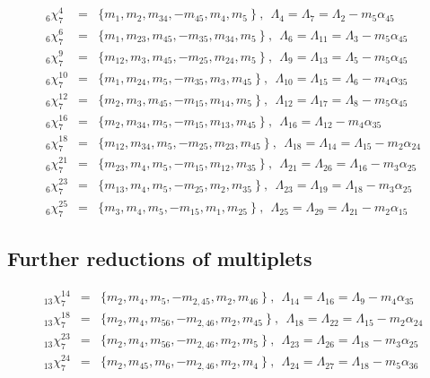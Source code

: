 \documentclass[a4paper]{jpconf}
\def\np{\newpage}
\def\bb {\begin {eqnarray}}
\def\eqnn#1{\bb\label{#1}}
\def\eea {\end {eqnarray}}
\def\nn{\nonumber}
\def\np{\vfill\eject}
\def\a{\alpha}
\def\L{\Lambda}
\begin{document}
   \eqnn{slt76}
  _6\chi^4_7 &=& \{ m_1, m_2, m_{34}, -m_{45}, m_{4}, m_{5} \   \} \ ,~~\L_4 = \L_7 = \L_2 - m_5 \a_{45}  \\
 _6\chi^6_7 &=& \{ m_1, m_{23}, m_{45}, -m_{35}, m_{34}, m_{5} \   \} \ ,~~\L_6 = \L_{11} = \L_3 - m_5 \a_{45} \nn\\ %
 _6\chi^9_7 &=& \{ m_{12}, m_{3}, m_{45}, -m_{25}, m_{24}, m_{5} \   \} \ ,~~\L_9 = \L_{13} = \L_5 - m_5 \a_{45} \nn\\ %
_6\chi^{10}_7 &=& \{ m_1, m_{24}, m_{5}, -m_{35}, m_{3}, m_{45} \   \} \ ,~~\L_{10} = \L_{15} = \L_6 - m_4 \a_{35}  \nn\\ %
 _6\chi^{12}_7 &=& \{ m_2, m_{3}, m_{45}, -m_{15}, m_{14}, m_{5} \   \} \ ,~~\L_{12} = \L_{17} = \L_8 - m_5 \a_{45} \nn\\ %
   _6\chi^{16}_7 &=& \{ m_2, m_{34}, m_{5}, -m_{15}, m_{13}, m_{45} \   \} \ ,~~\L_{16} = \L_{12} - m_4 \a_{35} \nn\\ %
 _6\chi^{18}_7 &=& \{ m_{12}, m_{34}, m_{5}, -m_{25}, m_{23}, m_{45} \   \} \ ,~~\L_{18} = \L_{14} =\L_{15} - m_2 \a_{24}  \nn\\ %
  _6\chi^{21}_7 &=& \{ m_{23}, m_{4}, m_{5}, -m_{15}, m_{12}, m_{35} \   \} \ ,~~\L_{21} = \L_{26} =\L_{16} - m_3 \a_{25} \nn\\ %
 _6\chi^{23}_7 &=& \{ m_{13}, m_{4}, m_{5}, -m_{25}, m_{2}, m_{35} \   \} \ ,~~\L_{23} =\L_{19} =  \L_{18} - m_3 \a_{25}  \nn\\ %
 _6\chi^{25}_7 &=& \{ m_{3}, m_{4}, m_{5}, -m_{15}, m_{1}, m_{25} \   \} \ ,~~\L_{25} = \L_{29} =\L_{21} - m_2 \a_{15}
  \nn\eea %

  \subsection{Further reductions of multiplets}

  \eqnn{slt713}
    _{13}\chi^{14}_7 &=& \{ m_{2}, m_{4}, m_{5}, -m_{2,45}, m_{2}, m_{46} \   \} \ ,~~\L_{14} = \L_{16} =\L_9 - m_4 \a_{35} \\ %
   _{13}\chi^{18}_7 &=& \{ m_{2}, m_{4}, m_{56}, -m_{2,46}, m_{2}, m_{45} \   \} \ ,~~\L_{18} = \L_{22} = \L_{15} - m_2 \a_{24}  \nn\\ %
  _{13}\chi^{23}_7 &=& \{ m_{2}, m_{4}, m_{56}, -m_{2,46}, m_{2}, m_{5} \   \} \ ,~~\L_{23} = \L_{26} = \L_{18} - m_3 \a_{25}  \nn\\ %
_{13}\chi^{24}_7 &=& \{ m_{2}, m_{45}, m_{6}, -m_{2,46}, m_{2}, m_{4} \   \} \ ,~~\L_{24} = \L_{27} = \L_{18} - m_5 \a_{36}   %
      \nn\eea %
\end{document}
